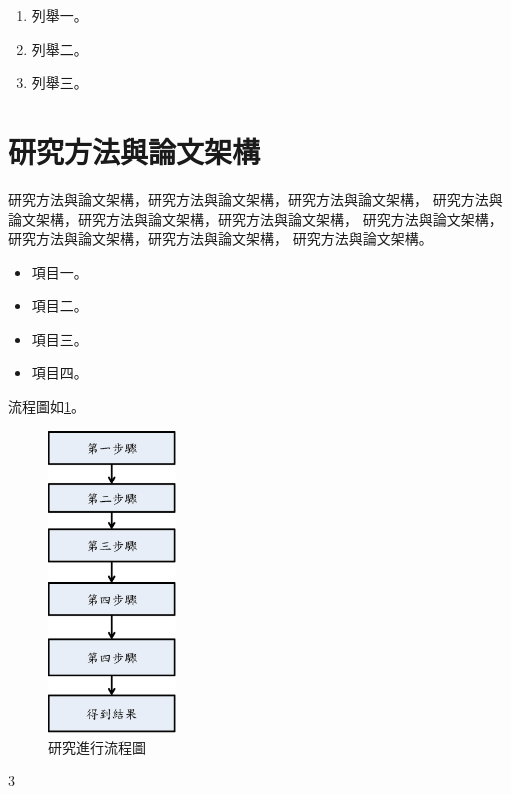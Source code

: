 \begin{enumerate}
	\item
	      列舉一。
	\item
	      列舉二。
	\item
	      列舉三。
\end{enumerate}

\section {研究方法與論文架構}
研究方法與論文架構，研究方法與論文架構，研究方法與論文架構，
研究方法與論文架構，研究方法與論文架構，研究方法與論文架構，
研究方法與論文架構，研究方法與論文架構，研究方法與論文架構，
研究方法與論文架構。

\begin{itemize}
	\item
	      項目一。
	\item
	      項目二。
	\item
	      項目三。
	\item
	      項目四。
\end{itemize}

流程圖如\ref{fig:ResearchFlowChart}。
\begin{figure}[htbp]
	\centering
	\includegraphics[height=8cm]{graphs/introduction/ResearchFlowChart.eps}
	\caption{研究進行流程圖}
	\label{fig:ResearchFlowChart}
\end{figure}
3
